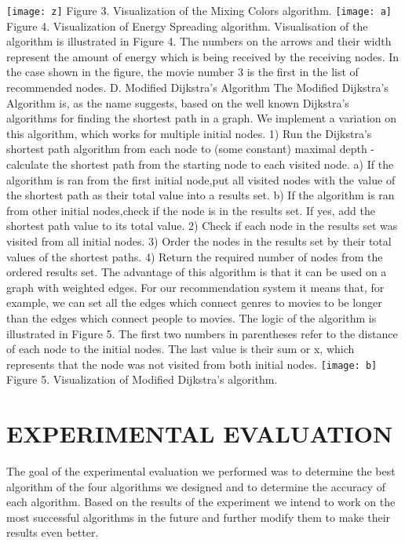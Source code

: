 \documentclass[10pt,slovak,a4paper]{article}
\begin{document}
\begin{multicols}{2}
 \texttt{[image: z]}
	Figure 3.	Visualization of the Mixing Colors algorithm.
 \texttt{[image: a]}
	Figure 4.	Visualization of Energy Spreading algorithm.
Visualisation of the algorithm is illustrated in Figure 4. The numbers on the arrows and their width represent the amount of energy which is being received by the receiving nodes. In the case shown in the figure, the movie number 3 is the first in the list of recommended nodes.
D. Modified Dijkstra’s Algorithm
The Modified Dijkstra’s Algorithm is, as the name suggests, based on the well known Dijkstra’s algorithms for finding the shortest path in a graph. We implement a variation on this algorithm, which works for multiple initial nodes.
1)	Run the Dijkstra’s shortest path algorithm from each node to (some constant) maximal depth - calculate the shortest path from the starting node to each visited node.
a)	If the algorithm is ran from the first initial node,put all visited nodes with the value of the shortest path as their total value into a results set.
b)	If the algorithm is ran from other initial nodes,check if the node is in the results set. If yes, add the shortest path value to its total value.
2)	Check if each node in the results set was visited from all initial nodes.
3)	Order the nodes in the results set by their total values of the shortest paths.
4)	Return the required number of nodes from the ordered results set.
The advantage of this algorithm is that it can be used on a graph with weighted edges. For our recommendation system it means that, for example, we can set all the edges which connect genres to movies to be longer than the edges which connect people to movies.
The logic of the algorithm is illustrated in Figure 5. The first two numbers in parentheses refer to the distance of each node to the initial nodes. The last value is their sum or x, which represents that the node was not visited from both initial nodes.
 \texttt{[image: b]}
	Figure 5.	Visualization of Modified Dijkstra’s algorithm.
\centering \section{EXPERIMENTAL EVALUATION}
The goal of the experimental evaluation we performed was to determine the best algorithm of the four algorithms we designed and to determine the accuracy of each algorithm. Based on the results of the experiment we intend to work on the most successful algorithms in the future and further modify them to make their results even better.

\end{multicols}
\end{document}
